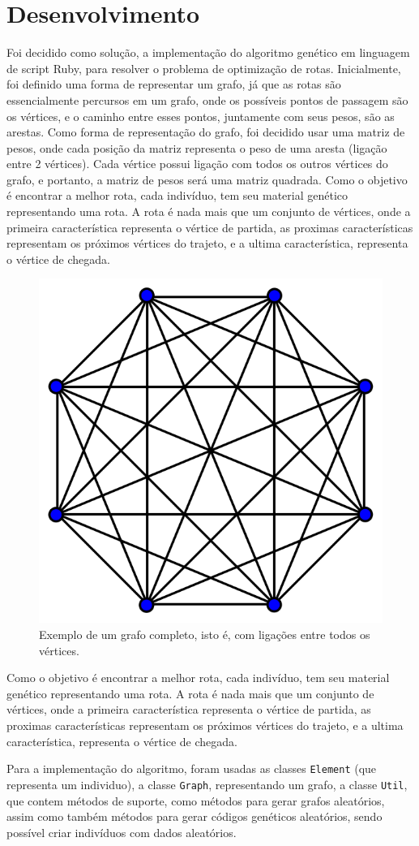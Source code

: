 \section{Desenvolvimento}

Foi decidido como solução, a implementação do algoritmo genético em linguagem de script Ruby, para resolver o problema de optimização de rotas. Inicialmente, foi definido uma forma de representar um grafo, já que as rotas são essencialmente percursos em um grafo, onde os possíveis pontos de passagem são os vértices, e o caminho entre esses pontos, juntamente com seus pesos, são as arestas. Como forma de representação do grafo, foi decidido usar uma matriz de pesos, onde cada posição da matriz representa o peso de uma aresta (ligação entre 2 vértices). Cada vértice possui ligação com todos os outros vértices do grafo, e portanto, a matriz de pesos será uma matriz quadrada.
Como o objetivo é encontrar a melhor rota, cada indivíduo, tem seu material genético representando uma rota. A rota é nada mais que um conjunto de vértices, onde a primeira característica representa o vértice de partida, as proximas características representam os próximos vértices do trajeto, e a ultima característica, representa o vértice de chegada.

\begin{figure}[!ht]
		\centering
		\includegraphics[width=.4\textwidth]{data/complete-graph.png}
		\caption{Exemplo de um grafo completo, isto é, com ligações entre todos os vértices.}
		\label{fig}
	\end{figure}

Como o objetivo é encontrar a melhor rota, cada indivíduo, tem seu material genético representando uma rota. A rota é nada mais que um conjunto de vértices, onde a primeira característica representa o vértice de partida, as proximas características representam os próximos vértices do trajeto, e a ultima característica, representa o vértice de chegada.

Para a implementação do algoritmo, foram usadas as classes \texttt{Element} (que representa um individuo), a classe \texttt{Graph}, representando um grafo, a classe \texttt{Util}, que contem métodos de suporte, como métodos para gerar grafos aleatórios, assim como também métodos para gerar códigos genéticos aleatórios, sendo possível criar indivíduos com dados aleatórios.

